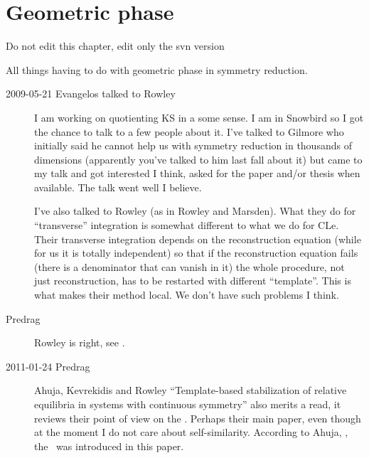 

\chapter{Geometric phase}
\label{c-geometric}

\bigskip\bigskip
\noindent
{\color{red} Do not edit this chapter, edit only the svn version}
\bigskip\bigskip

All things having to do with geometric phase in symmetry reduction.

\begin{description}

\item[2009-05-21 Evangelos talked to Rowley]
I am working on quotienting KS in a some sense. I am in
Snowbird so I got the chance to talk to a few people about
it. I've talked to Gilmore who initially said he cannot help
us with symmetry reduction in thousands of dimensions
(apparently you've talked to him last fall about it) but came
to my talk and got interested I think, asked for the paper
and/or thesis when available. The talk went well I believe.

I've also talked to Rowley (as in Rowley and Marsden). What
they do for ``transverse'' integration is somewhat different to
what we do for CLe. Their transverse integration depends on
the reconstruction equation (while for us it is totally
independent) so that if the reconstruction equation fails
(there is a denominator that can vanish in it) the whole
procedure, not just reconstruction, has to be restarted with
different ``template''. This is what makes their method local.
We don't have such problems I think.

\item[Predrag]
Rowley is right, see .

\item[2011-01-24 Predrag]                               \toCB
Ahuja, Kevrekidis and Rowley
 {``Template-based
stabilization} of relative equilibria in systems with continuous
symmetry'' also merits a read, it reviews their point of view on the
\mslices. Perhaps their main paper, even though at the moment I do
not care about self-similarity. According to Ahuja,
\etal{}, the \mslices\ was introduced in
this paper.


\end{description}
